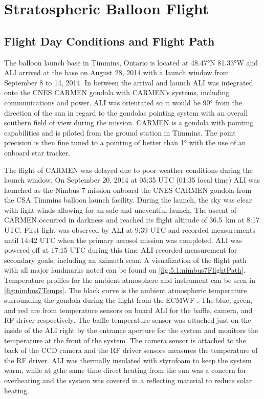 \documentclass[12pt]{article}
\begin{document}
\section{Stratospheric Balloon Flight}

\subsection{Flight Day Conditions and Flight Path}

The balloon launch base in Timmins, Ontario is located at 48.47\si{\degree}N 81.33\si{\degree}W and ALI arrived at the base on August 28, 2014 with a launch window from September 8 to 14, 2014. In between the arrival and launch ALI was integrated onto the CNES CARMEN gondola with CARMEN's systems, including communications and power. ALI was orientated so it would be 90\si{\degree} from the direction of the sun in regard to the gondolas pointing system with an overall southern field of view during the mission. CARMEN is a gondola with pointing capabilities and is piloted from the ground station in Timmins. The point precision is then fine tuned to a pointing of better than 1\si{\degree} with the use of an onboard star tracker.

The flight of CARMEN was delayed due to poor weather conditions during the launch window. On September 20, 2014 at 05:35 UTC (01:35 local time) ALI was launched as the Nimbus 7 mission onboard the CNES CARMEN gondola from the CSA Timmins balloon launch facility. During the launch, the sky was clear with light winds allowing for an safe and uneventful launch. The ascent of CARMEN occurred in darkness and reached its flight altitude of 36.5~km at 8:17 UTC. First light was observed by ALI at 9:39 UTC and recorded measurements until 14:42 UTC when the primary aerosol mission was completed. ALI was powered off at 17:15 UTC during this time  ALI recorded measurement for secondary goals, including an azimuth scan. A visualization of the flight path with all major landmarks noted can be found on \autoref{fig:5.1:nimbus7FlightPath}. Temperature profiles for the ambient atmosphere and instrument can be seen in \autoref{fig:nimbus7Temps}. The black curve is the ambient atmospheric temperature surrounding the gondola during the flight from the ECMWF \cite{Molteni1996}. The blue, green, and red are from temperature sensors on board ALI for the baffle, camera, and RF driver respectively. The baffle temperature sensor was attached just on the inside of the ALI right by the entrance aperture for the system and monitors the temperature at the front of the system. The camera sensor is attached to the back of the CCD camera and the RF driver sensors measures the temperature of the RF driver. ALI was thermally insulated with styrofoam to keep the system warm, while at gthe same time direct heating from the sun was a concern for overheating and the system was covered in a reflecting material to reduce solar heating.
\end{document}
